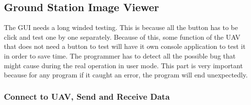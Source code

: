 \subsection{Ground Station Image Viewer}
The GUI needs a long winded testing. This is because all the button has to be click and test one by one separately. Because of this, some function of the UAV that does not need a button to test will have it own console application to test it in order to save time. The programmer has to detect all the possible bug that might cause during the real operation in user mode. This part is very important because for any program if it caught an error, the program will end unexpectedly.
\subsubsection{Connect to UAV, Send and Receive Data}

